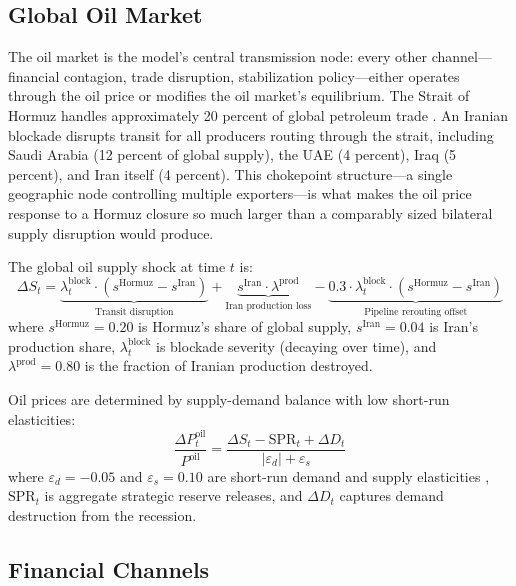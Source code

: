 \documentclass[12pt]{article}
\begin{document}
\subsection{Global Oil Market}

The oil market is the model's central transmission node: every other channel---financial contagion, trade disruption, stabilization policy---either operates through the oil price or modifies the oil market's equilibrium. The Strait of Hormuz handles approximately 20 percent of global petroleum trade \citep{eia2023hormuz}. An Iranian blockade disrupts transit for all producers routing through the strait, including Saudi Arabia (12 percent of global supply), the UAE (4 percent), Iraq (5 percent), and Iran itself (4 percent). This chokepoint structure---a single geographic node controlling multiple exporters---is what makes the oil price response to a Hormuz closure so much larger than a comparably sized bilateral supply disruption would produce.

The global oil supply shock at time $t$ is:
\begin{equation}
\Delta S_t = \underbrace{\lambda^{\text{block}}_t \cdot (s^{\text{Hormuz}} - s^{\text{Iran}})}_{\text{Transit disruption}} + \underbrace{s^{\text{Iran}} \cdot \lambda^{\text{prod}}}_{\text{Iran production loss}} - \underbrace{0.3 \cdot \lambda^{\text{block}}_t \cdot (s^{\text{Hormuz}} - s^{\text{Iran}})}_{\text{Pipeline rerouting offset}}
\label{eq:oil_supply}
\end{equation}
where $s^{\text{Hormuz}} = 0.20$ is Hormuz's share of global supply, $s^{\text{Iran}} = 0.04$ is Iran's production share, $\lambda^{\text{block}}_t$ is blockade severity (decaying over time), and $\lambda^{\text{prod}} = 0.80$ is the fraction of Iranian production destroyed.

Oil prices are determined by supply-demand balance with low short-run elasticities:
\begin{equation}
\frac{\Delta P^{\text{oil}}_t}{P^{\text{oil}}} = \frac{\Delta S_t - \text{SPR}_t + \Delta D_t}{|\varepsilon_d| + \varepsilon_s}
\label{eq:oil_price}
\end{equation}
where $\varepsilon_d = -0.05$ and $\varepsilon_s = 0.10$ are short-run demand and supply elasticities \citep{hamilton2009understanding}, $\text{SPR}_t$ is aggregate strategic reserve releases, and $\Delta D_t$ captures demand destruction from the recession.

\subsection{Financial Channels}
\end{document}
